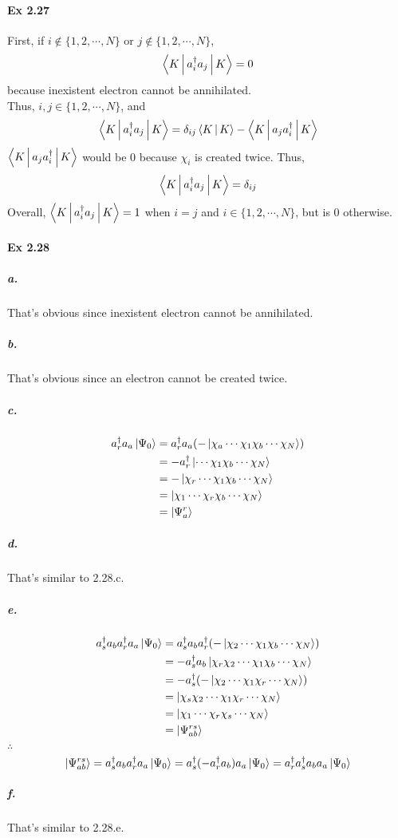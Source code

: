 \documentclass[a4paper]{article}
\newcommand{\ex}[1]{\paragraph{Ex #1}}
\newcommand{\subex}[1]{\subparagraph{#1}}
\numberwithin{equation}{subsection}
\begin{document}
\ex{2.27}
First, if $ i\notin \{1,2,\cdots,N\} $ or $ j\notin \{1,2,\cdots,N\} $, \begin{equation}\label{key}
\Braket{K | a_i^\dagger a_j | K} = 0
\end{equation}
because inexistent electron cannot be annihilated.\\
Thus, $ i,j\in \{1,2,\cdots,N\} $, and
\begin{equation}\label{key}
\Braket{K | a_i^\dagger a_j | K} = \delta_{ij}\Braket{K|K} - \Braket{K | a_j a_i^\dagger | K}
\end{equation}
$ \Braket{K | a_j a_i^\dagger | K} $ would be $ 0 $ because $ \chi_i $ is created twice. Thus,
\begin{equation}\label{key}
\Braket{K | a_i^\dagger a_j | K} = \delta_{ij}
\end{equation}
Overall, $ \Braket{K | a_i^\dagger a_j | K} = 1$ when $ i=j $ and $ i\in \{1,2,\cdots,N\} $, but is $ 0 $ otherwise.

\ex{2.28}
\subex{a.}
That's obvious since inexistent electron cannot be annihilated.
\subex{b.}
That's obvious since an electron cannot be created twice.
\subex{c.}
\begin{equation}\label{key}
\begin{aligned}
a_r^\dagger a_a\ket{\Psi_0} &= a_r^\dagger a_a (-\ket{\chi_a\cdots\chi_1\chi_b\cdots\chi_N})\\
&= -a_r^\dagger\ket{\cdots\chi_1\chi_b\cdots\chi_N}\\
&= -\ket{\chi_r\cdots\chi_1\chi_b\cdots\chi_N}\\
&= \ket{\chi_1\cdots\chi_r\chi_b\cdots\chi_N}\\
&= \ket{\Psi_a^r}
\end{aligned}
\end{equation}
\subex{d.}
That's similar to 2.28.c.
\subex{e.}
\begin{equation}\label{key}
\begin{aligned}
a_s^\dagger a_b a_r^\dagger a_a\ket{\Psi_0} 
&= a_s^\dagger a_b a_r^\dagger (-\ket{\chi_2\cdots\chi_1\chi_b\cdots\chi_N}) \\
&= -a_s^\dagger a_b \ket{\chi_r\chi_2\cdots\chi_1\chi_b\cdots\chi_N}\\
&= -a_s^\dagger (-\ket{\chi_2\cdots\chi_1\chi_r\cdots\chi_N}) \\
&= \ket{\chi_s\chi_2\cdots\chi_1\chi_r\cdots\chi_N}\\
&= \ket{\chi_1\cdots\chi_r\chi_s\cdots\chi_N}\\
&= \ket{\Psi_{ab}^{rs}}
\end{aligned}
\end{equation}
$ \therefore $
\begin{equation}\label{key}
\ket{\Psi_{ab}^{rs}} = a_s^\dagger a_b a_r^\dagger a_a\ket{\Psi_0} = a_s^\dagger (-a_r^\dagger a_b) a_a\ket{\Psi_0} = a_r^\dagger a_s^\dagger  a_b a_a\ket{\Psi_0} 
\end{equation}
\subex{f.}
That's similar to 2.28.e.
\end{document}
